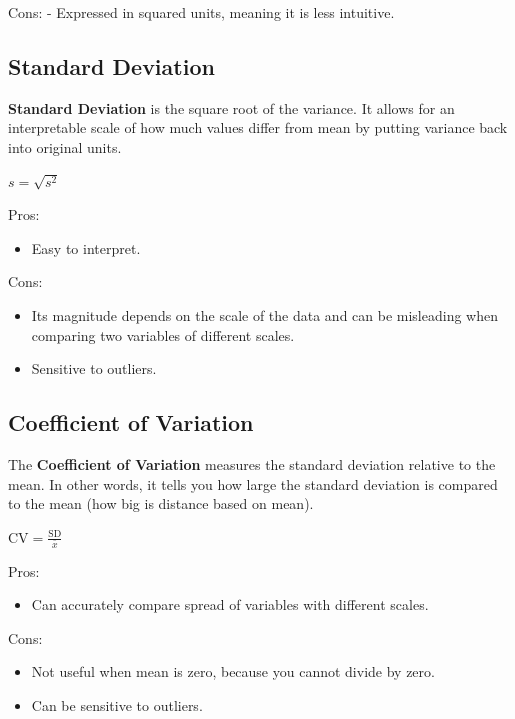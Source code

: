 \documentclass[
  letterpaper,
  DIV=11,
  numbers=noendperiod]{scrreprt}
\providecommand{\tightlist}{%
  \setlength{\itemsep}{0pt}\setlength{\parskip}{0pt}}
\begin{document}
Cons: - Expressed in squared units, meaning it is less intuitive.

\subsection{Standard Deviation}\label{standard-deviation}

\textbf{Standard Deviation} is the square root of the variance. It
allows for an interpretable scale of how much values differ from mean by
putting variance back into original units.

\(s = \sqrt{s^2}\)

Pros:

\begin{itemize}
\tightlist
\item
  Easy to interpret.
\end{itemize}

Cons:

\begin{itemize}
\tightlist
\item
  Its magnitude depends on the scale of the data and can be misleading
  when comparing two variables of different scales.
\item
  Sensitive to outliers.
\end{itemize}

\subsection{Coefficient of Variation}\label{coefficient-of-variation}

The \textbf{Coefficient of Variation} measures the standard deviation
relative to the mean. In other words, it tells you how large the
standard deviation is compared to the mean (how big is distance based on
mean).

\(\text{CV} = \frac{\text{SD}}{\bar{x}}\)

Pros:

\begin{itemize}
\tightlist
\item
  Can accurately compare spread of variables with different scales.
\end{itemize}

Cons:

\begin{itemize}
\tightlist
\item
  Not useful when mean is zero, because you cannot divide by zero.
\item
  Can be sensitive to outliers.
\end{itemize}
\end{document}
